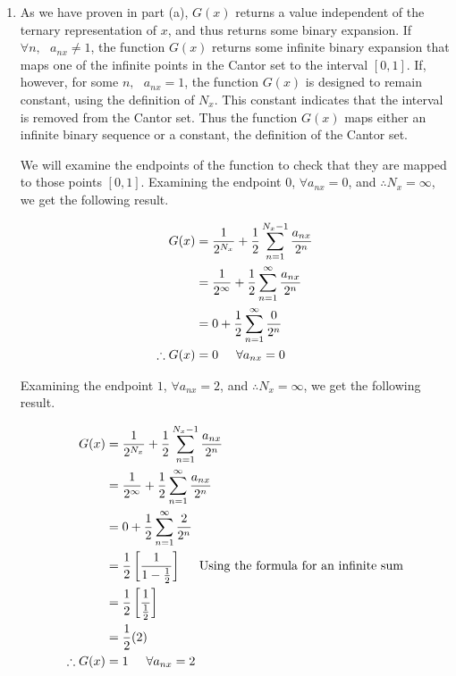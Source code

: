 \documentclass[a4paper]{article}
\begin{document}
\begin{enumerate}[label=\textbf{\arabic*.}]
\begin{enumerate}
		\item As we have proven in part (a), $G(x)$ returns a value independent of the ternary representation of $x$, and thus returns some binary expansion. If $\forall n, \text{ } a_{nx} \neq 1$, the function $G(x)$ returns some infinite binary expansion that maps one of the infinite points in the Cantor set to the interval $[0,1]$. If, however, for some $n, \text{ } a_{nx} = 1$, the function $G(x)$ is designed to remain constant, using the definition of $N_x$. This constant indicates that the interval is removed from the Cantor set. Thus the function $G(x)$ maps either an infinite binary sequence or a constant, the definition of the Cantor set. 

		\bigbreak
		We will examine the endpoints of the function to check that they are mapped to those points $[0,1]$. Examining the endpoint $0$, $\forall a_{nx} = 0$, and $\therefore N_x = \infty$, we get the following result.

		\begin{align*}
		G(x) & = \frac{1}{2^{N_x}} + \frac{1}{2}\sum_{n=1}^{N_x-1}\frac{a_{nx}}{2^{n}}\\
		& = \frac{1}{2^{\infty}} + \frac{1}{2}\sum_{n=1}^{\infty}\frac{a_{nx}}{2^{n}}\\
		& = 0 + \frac{1}{2}\sum_{n=1}^{\infty}\frac{0}{2^{n}}\\
		\therefore G(x) & = 0 \hspace{5mm} \forall a_{nx} = 0\\
		\end{align*}

		\pagebreak

		Examining the endpoint $1$, $\forall a_{nx} = 2$, and $\therefore N_x = \infty$, we get the following result.

		\begin{align*}
		G(x) & = \frac{1}{2^{N_x}} + \frac{1}{2}\sum_{n=1}^{N_x-1}\frac{a_{nx}}{2^{n}}\\
		& = \frac{1}{2^{\infty}} + \frac{1}{2}\sum_{n=1}^{\infty}\frac{a_{nx}}{2^{n}}\\
		& = 0 + \frac{1}{2}\sum_{n=1}^{\infty}\frac{2}{2^{n}}\\
		& = \frac{1}{2}\left[\frac{1}{1-\frac{1}{2}}\right] \hspace{5mm} \text{Using the formula for an infinite sum}\\
		& = \frac{1}{2}\left[\frac{1}{\frac{1}{2}}\right]\\
		& = \frac{1}{2}(2)\\
		\therefore G(x) & = 1 \hspace{5mm} \forall a_{nx} = 2\\
		\end{align*}


\end{enumerate}
\end{enumerate}
\end{document}
